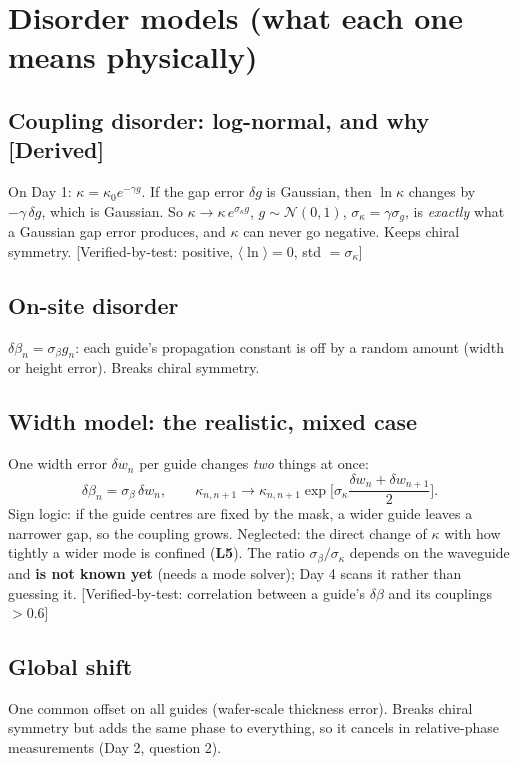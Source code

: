 \documentclass[10pt,a4paper]{article}
\newcommand{\evd}[1]{\textsf{\small[#1]}}
\begin{document}
\section{Disorder models (what each one means physically)}
\subsection{Coupling disorder: log-normal, and why \evd{Derived}}
On Day 1: $\kappa=\kappa_0e^{-\gamma g}$. If the gap error $\delta g$ is Gaussian, then $\ln\kappa$ changes by $-\gamma\,\delta g$, which is Gaussian. So $\kappa\to\kappa\,e^{\sigma_\kappa g}$, $g\sim\mathcal N(0,1)$, $\sigma_\kappa=\gamma\sigma_g$, is \emph{exactly} what a Gaussian gap error produces, and $\kappa$ can never go negative. Keeps chiral symmetry. \evd{Verified-by-test: positive, $\langle\ln\rangle=0$, std $=\sigma_\kappa$}

\subsection{On-site disorder}
$\delta\beta_n=\sigma_\beta g_n$: each guide's propagation constant is off by a random amount (width or height error). Breaks chiral symmetry.

\subsection{Width model: the realistic, mixed case}
One width error $\delta w_n$ per guide changes \emph{two} things at once:
\[
\delta\beta_n=\sigma_\beta\,\delta w_n,\qquad \kappa_{n,n+1}\to\kappa_{n,n+1}\exp\!\Big[\sigma_\kappa\frac{\delta w_n+\delta w_{n+1}}{2}\Big].
\]
Sign logic: if the guide centres are fixed by the mask, a wider guide leaves a narrower gap, so the coupling grows. Neglected: the direct change of $\kappa$ with how tightly a wider mode is confined (\textbf{L5}). The ratio $\sigma_\beta/\sigma_\kappa$ depends on the waveguide and \textbf{is not known yet} (needs a mode solver); Day 4 scans it rather than guessing it. \evd{Verified-by-test: correlation between a guide's $\delta\beta$ and its couplings $>0.6$}

\subsection{Global shift}
One common offset on all guides (wafer-scale thickness error). Breaks chiral symmetry but adds the same phase to everything, so it cancels in relative-phase measurements (Day 2, question 2).
\end{document}
